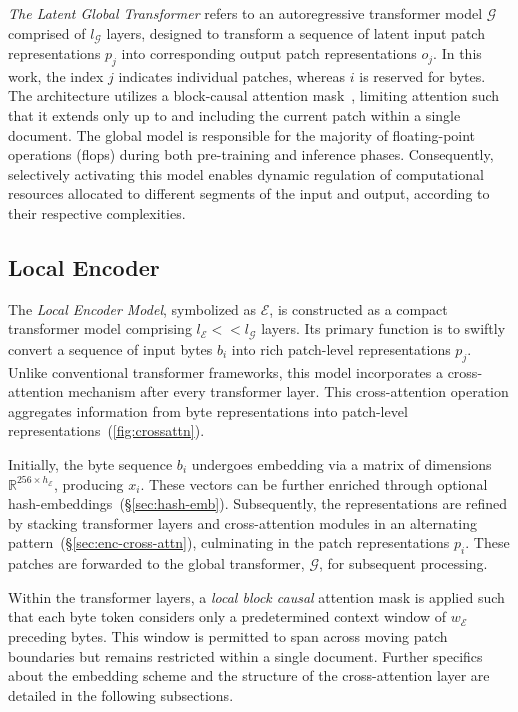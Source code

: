 \textit{The Latent Global Transformer} refers to an autoregressive transformer model $\mathcal{G}$ comprised of $l_{\mathcal{G}}$ layers, designed to transform a sequence of latent input patch representations $p_j$ into corresponding output patch representations $o_j$. In this work, the index $j$ indicates individual patches, whereas $i$ is reserved for bytes. The architecture utilizes a block-causal attention mask~\citep{dubey2024llama}, limiting attention such that it extends only up to and including the current patch within a single document. The global model is responsible for the majority of floating-point operations (flops) during both pre-training and inference phases. Consequently, selectively activating this model enables dynamic regulation of computational resources allocated to different segments of the input and output, according to their respective complexities.

\subsection{Local Encoder}
\label{section:local}

The \textit{Local Encoder Model}, symbolized as $\mathcal{E}$, is constructed as a compact transformer model comprising $l_{\mathcal{E}} << l_{\mathcal{G}}$ layers. Its primary function is to swiftly convert a sequence of input bytes $b_i$ into rich patch-level representations $p_j$. Unlike conventional transformer frameworks, this model incorporates a cross-attention mechanism after every transformer layer. This cross-attention operation aggregates information from byte representations into patch-level representations~(\autoref{fig:crossattn}).

Initially, the byte sequence $b_i$ undergoes embedding via a matrix of dimensions $\mathbb{R}^{256 \times h_{\mathcal{E}}}$, producing $x_i$. These vectors can be further enriched through optional hash-embeddings~(\S\ref{sec:hash-emb}). Subsequently, the representations are refined by stacking transformer layers and cross-attention modules in an alternating pattern~(\S\ref{sec:enc-cross-attn}), culminating in the patch representations $p_i$. These patches are forwarded to the global transformer, $\mathcal{G}$, for subsequent processing.

Within the transformer layers, a \textit{local block causal} attention mask is applied such that each byte token considers only a predetermined context window of $w_{\mathcal{E}}$ preceding bytes. This window is permitted to span across moving patch boundaries but remains restricted within a single document. Further specifics about the embedding scheme and the structure of the cross-attention layer are detailed in the following subsections.

